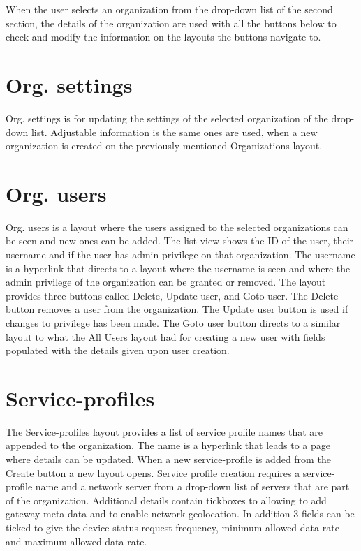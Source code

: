 When the user selects an organization from the drop-down list of the second section, the details of the organization are used with all the buttons below to check and modify the information on the layouts the buttons navigate to.

\section{Org. settings}
Org. settings is for updating the settings of the selected organization of the drop-down list.
Adjustable information is the same ones are used, when a new organization is created on the previously mentioned Organizations layout.

\section{Org. users}
Org. users is a layout where the users assigned to the selected organizations can be seen and new ones can be added.
The list view shows the ID of the user, their username and if the user has admin privilege on that organization.
The username is a hyperlink that directs to a layout where the username is seen and where the admin privilege of the organization can be granted or removed.
The layout provides three buttons called Delete, Update user, and Goto user.
The Delete button removes a user from the organization.
The Update user button is used if changes to privilege has been made.
The Goto user button directs to a similar layout to what the All Users layout had for creating a new user with fields populated with the details given upon user creation.
\clearpage

\section{Service-profiles}
The Service-profiles layout provides a list of service profile names that are appended to the organization.
The name is a hyperlink that leads to a page where details can be updated.
When a new service-profile is added from the Create button a new layout opens.
Service profile creation requires a service-profile name and a network server from a drop-down list of servers that are part of the organization.
Additional details contain tickboxes to allowing to add gateway meta-data and to enable network geolocation.
In addition 3 fields can be ticked to give the device-status request frequency, minimum allowed data-rate and maximum allowed data-rate.

